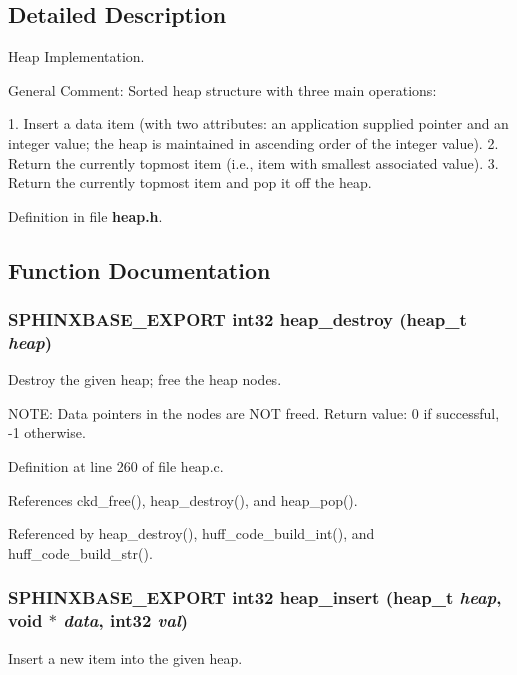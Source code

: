 \subsection{Detailed Description}
Heap Implementation. 

General Comment: Sorted heap structure with three main operations:

1. Insert a data item (with two attributes: an application supplied pointer and an integer value; the heap is maintained in ascending order of the integer value). 2. Return the currently topmost item (i.e., item with smallest associated value). 3. Return the currently topmost item and pop it off the heap. 

Definition in file {\bf heap.h}.

\subsection{Function Documentation}
\subsubsection[{heap\_\-destroy}]{\setlength{\rightskip}{0pt plus 5cm}SPHINXBASE\_\-EXPORT int32 heap\_\-destroy (heap\_\-t {\em heap})}\label{heap_8h_d8d290888b0cf3bf94b0296d93a61c8e}


Destroy the given heap; free the heap nodes. 

NOTE: Data pointers in the nodes are NOT freed. Return value: 0 if successful, -1 otherwise. 

Definition at line 260 of file heap.c.

References ckd\_\-free(), heap\_\-destroy(), and heap\_\-pop().

Referenced by heap\_\-destroy(), huff\_\-code\_\-build\_\-int(), and huff\_\-code\_\-build\_\-str().
\subsubsection[{heap\_\-insert}]{\setlength{\rightskip}{0pt plus 5cm}SPHINXBASE\_\-EXPORT int32 heap\_\-insert (heap\_\-t {\em heap}, \/  void $\ast$ {\em data}, \/  int32 {\em val})}\label{heap_8h_d1c648ca164bf39d03431d7126ef4a8d}


Insert a new item into the given heap. 

